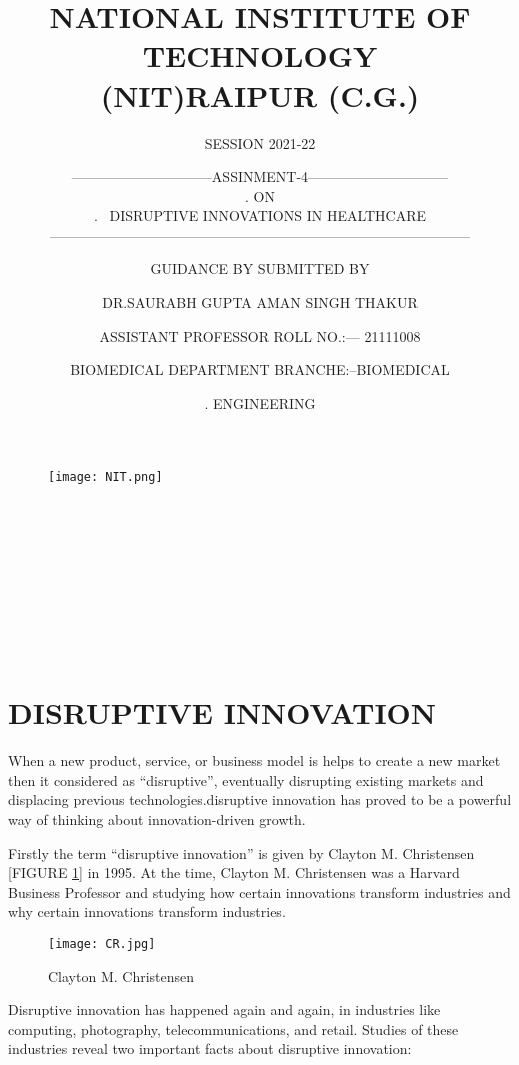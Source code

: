 \documentclass[12pt]{article}
\title{NATIONAL INSTITUTE OF TECHNOLOGY\\
(NIT)RAIPUR (C.G.)}
\author {SESSION 2021-22}
\date{}
\begin{document}
\maketitle
\begin{figure}[h]
\centering
\texttt{[image: NIT.png]}
\end{figure}
\author{------------------------------ASSINMENT-4------------------------------ \\
.\> \>\> \>\> \>\>\> \>\> \>\>\>\>\>\>  \>\> \>\>\> \>\> \>\> \> \>\> \>\> \>\> \>\> ON\\ 
.\> \>\> \>\> \>\ {DISRUPTIVE INNOVATIONS IN    HEALTHCARE}\\
------------------------------------------------------------------------------------------
 }\\


\author{GUIDANCE BY \> \>\> \>\> \>\>\> \>\> \>\>\>\>\>\>  \>\> \>\>\> \>\> \>\> \> \>\> \>\> \>\> \>\>  SUBMITTED BY }\\


\author{DR.SAURABH GUPTA\>  \>\> \>\> \>  \>\> \>\>\>\>\>  \>\> \>\>\>  \>\> \>\> \>  \>\> AMAN SINGH THAKUR }\\

\author{ ASSISTANT PROFESSOR\>  \>\> \>  \> \>   \>\> \>\> \> \>\> \> \>\> \>  ROLL NO.:--- 21111008 }\\
\author{BIOMEDICAL DEPARTMENT\>  \>\> \>\> \>  \>\> \>\> \>\>   \>\> BRANCHE:--BIOMEDICAL  }\\
\author{.\>   \>\> \>\> \>  \>\> \>\> \>\> \>\> \>\> \>  \>\> \>\> \>\>\>\> \>\> \>\>  \>\> \>\> \>\> \>\>\> \>\> \>   \>\> \>\> \>\> \>\>\> \>\> \>    \>\> \>\> \>\> \>\> \>\> \>  \>\> \>\> \>\>  \>\> ENGINEERING }
\clearpage
\tableofcontents
\clearpage
\section{DISRUPTIVE INNOVATION  }
When  a new product, service, or business model is helps  to create a new market then it considered as “disruptive”, eventually disrupting existing markets and displacing previous technologies.disruptive innovation has proved to be a powerful way of thinking about innovation-driven growth.

Firstly the term “disruptive innovation” is given by Clayton M. Christensen [FIGURE \ref{fig_CR}]   in 1995. At the time, Clayton M. Christensen was a Harvard Business Professor and studying how certain innovations transform industries and why certain innovations transform industries.
\begin{figure}[h]
\centering
\texttt{[image: CR.jpg]}
\caption{Clayton M. Christensen}
\label{fig_CR}
\end{figure}
Disruptive innovation has happened again and again, in industries like computing, photography, telecommunications, and retail. Studies of these industries reveal two important facts about disruptive innovation:\\
\end{document}
